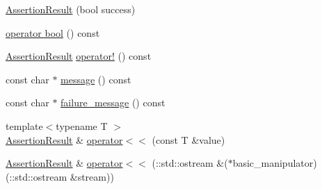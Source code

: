 \begin{DoxyCompactItemize}
\item 
\hyperlink{classtesting_1_1_assertion_result_ade695178c05c4b2f82e92930c912fc25}{Assertion\-Result} (bool success)
\item 
\hyperlink{classtesting_1_1_assertion_result_af85b7852e6399467cd74df539810abcd}{operator bool} () const 
\item 
\hyperlink{classtesting_1_1_assertion_result}{Assertion\-Result} \hyperlink{classtesting_1_1_assertion_result_a85301ba52aa1efe89b79d1e3b59160cd}{operator!} () const 
\item 
const char $\ast$ \hyperlink{classtesting_1_1_assertion_result_ab20c91eba13e20f1b4ad89e3d15f69a8}{message} () const 
\item 
const char $\ast$ \hyperlink{classtesting_1_1_assertion_result_ae54fa82506c507a9dbc0f85d2cec652a}{failure\-\_\-message} () const 
\item 
{\footnotesize template$<$typename T $>$ }\\\hyperlink{classtesting_1_1_assertion_result}{Assertion\-Result} \& \hyperlink{classtesting_1_1_assertion_result_a3230efa81aafe7c61f5fb878cfa39e91}{operator$<$$<$} (const T \&value)
\item 
\hyperlink{classtesting_1_1_assertion_result}{Assertion\-Result} \& \hyperlink{classtesting_1_1_assertion_result_a43ae8a260843ce2ff3dc9af262672b8b}{operator$<$$<$} (\-::std\-::ostream \&($\ast$basic\-\_\-manipulator)(\-::std\-::ostream \&stream))
\end{DoxyCompactItemize}


